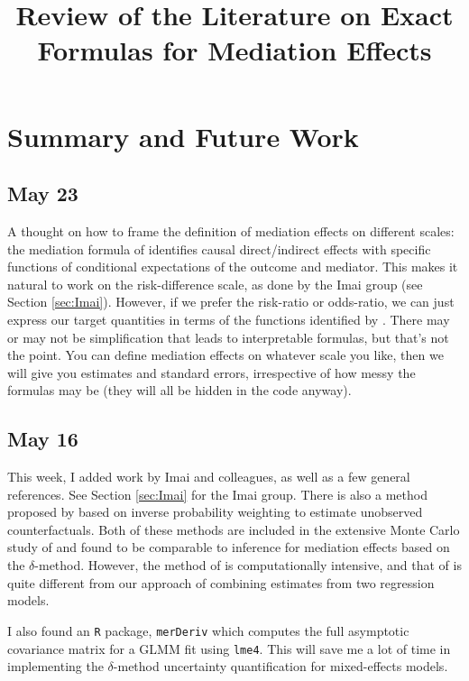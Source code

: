 \documentclass{article}
\title{Review of the Literature on Exact Formulas for Mediation Effects}
\begin{document}
\maketitle

\section{Summary and Future Work}

\subsection{May 23}

A thought on how to frame the definition of mediation effects on different scales: the mediation formula of \citet{Pea12} identifies causal direct/indirect effects with specific functions of conditional expectations of the outcome and mediator. This makes it natural to work on the risk-difference scale, as done by the Imai group (see Section \ref{sec:Imai}). However, if we prefer the risk-ratio or odds-ratio, we can just express our target quantities in terms of the functions identified by \citet{Pea12}. There may or may not be simplification that leads to interpretable formulas, but that's not the point. You can define mediation effects on whatever scale you like, then we will give you estimates and standard errors, irrespective of how messy the formulas may be (they will all be hidden in the code anyway).


\subsection{May 16}

This week, I added work by Imai and colleagues, as well as a few general references. See Section \ref{sec:Imai} for the Imai group. There is also a method proposed by \citet{Lan12} based on inverse probability weighting to estimate unobserved counterfactuals. Both of these methods are included in the extensive Monte Carlo study of \citet{Sam23} and found to be comparable to inference for mediation effects based on the $\delta$-method. However, the method of \citet{Ima10I} is computationally intensive, and that of \citet{Lan12} is quite different from our approach of combining estimates from two regression models.

I also found an \texttt{R} package, \texttt{merDeriv} \citep{Wan18} which computes the full asymptotic covariance matrix for a GLMM fit using \texttt{lme4}. This will save me a lot of time in implementing the $\delta$-method uncertainty quantification for mixed-effects models. 
\end{document}
